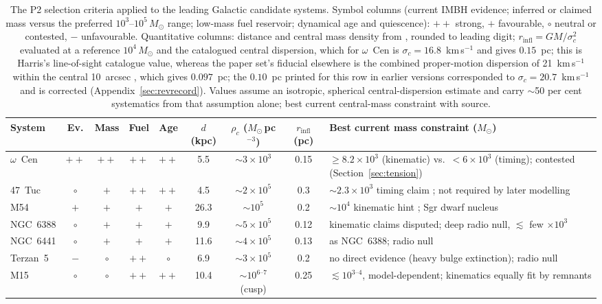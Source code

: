 \documentclass[11pt]{article}
\newcommand{\msun}{\ensuremath{M_\odot}}
\begin{document}
\begin{table}[tbp]
\centering
\caption{The P2 selection criteria applied to the leading Galactic candidate systems. Symbol columns (current IMBH evidence; inferred or claimed mass versus the preferred $10^{3}$--$10^{5}\,\msun$ range; low-mass fuel reservoir; dynamical age and quiescence): $++$ strong, $+$ favourable, $\circ$ neutral or contested, $-$ unfavourable. Quantitative columns: distance and central mass density from \citet{Harris1996,BaumgardtVasiliev2021}, rounded to leading digit; $r_{\mathrm{infl}} = GM/\sigma_c^{2}$ evaluated at a reference $10^{4}\,\msun$ and the catalogued central dispersion, which for $\omega$~Cen is $\sigma_c = 16.8$~km\,s$^{-1}$ \citep{Harris1996} and gives $0.15$~pc; this is Harris's line-of-sight catalogue value, whereas the paper set's fiducial elsewhere is the combined proper-motion dispersion of 21~km\,s$^{-1}$ within the central 10~arcsec \citep{Haberle2025oMEGACatVI}, which gives $0.097$~pc; the $0.10$~pc printed for this row in earlier versions corresponded to $\sigma_c = 20.7$~km\,s$^{-1}$ and is corrected (Appendix~\ref{sec:revrecord}). Values assume an isotropic, spherical central-dispersion estimate and carry $\sim$50 per cent systematics from that assumption alone; best current central-mass constraint with source.}
\label{tab:candidates}
\scriptsize
\begin{tabular}{p{1.5cm}cccc c c c p{4.6cm}}
\toprule
System & Ev. & Mass & Fuel & Age & $d$ (kpc) & $\rho_c$ ($\msun\,$pc$^{-3}$) & $r_{\mathrm{infl}}$ (pc) & Best current mass constraint ($\msun$) \\
\midrule
$\omega$~Cen & $++$ & $++$ & $++$ & $++$ & 5.5 & $\sim$$3\times10^{3}$ & 0.15 & $\geq 8.2\times10^{3}$ (kinematic) vs.\ $<6\times10^{3}$ (timing); contested (Section~\ref{sec:tension}) \citep{Haberle2024Nature,BanaresHernandez2025} \\
47~Tuc & $\circ$ & $+$ & $++$ & $++$ & 4.5 & $\sim$$2\times10^{5}$ & 0.3 & $\sim$$2.3\times10^{3}$ timing claim \citep{Kiziltan2017}; not required by later modelling \citep{Mann2019} \\
M54 & $+$ & $+$ & $+$ & $+$ & 26.3 & $\sim$$10^{5}$ & 0.2 & $\sim$$10^{4}$ kinematic hint \citep{Greene2020}; Sgr dwarf nucleus \\
NGC~6388 & $\circ$ & $+$ & $+$ & $+$ & 9.9 & $\sim$$5\times10^{5}$ & 0.12 & kinematic claims disputed; deep radio null, $\lesssim$ few $\times10^{3}$ \citep{Tremou2018} \\
NGC~6441 & $\circ$ & $+$ & $+$ & $+$ & 11.6 & $\sim$$4\times10^{5}$ & 0.13 & as NGC~6388; radio null \citep{Tremou2018} \\
Terzan~5 & $-$ & $\circ$ & $++$ & $\circ$ & 6.9 & $\sim$$3\times10^{5}$ & 0.2 & no direct evidence (heavy bulge extinction); radio null \citep{Tremou2018} \\
M15 & $\circ$ & $\circ$ & $++$ & $++$ & 10.4 & $\sim$$10^{6\text{--}7}$ (cusp) & 0.25 & $\lesssim$$10^{3\text{--}4}$, model-dependent; kinematics equally fit by remnants \citep{Greene2020} \\
\bottomrule
\end{tabular}
\end{table}
\end{document}
